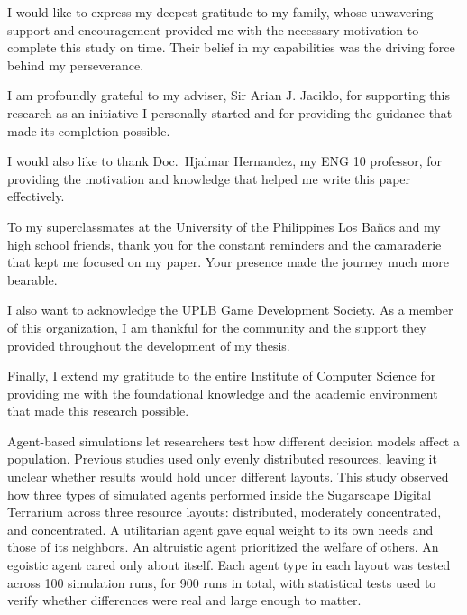 \documentclass{icsthesis}
\begin{document}
\begin{frontmatter}
\begin{biosketch}
			\addauthorsignaturefield
		\end{biosketch}

		\begin{acknowledgement}
			I would like to express my deepest gratitude to my family, whose unwavering support and encouragement provided me with the necessary motivation to complete this study on time. Their belief in my capabilities was the driving force behind my perseverance.

			I am profoundly grateful to my adviser, Sir Arian J. Jacildo, for supporting this research as an initiative I personally started and for providing the guidance that made its completion possible.

			I would also like to thank Doc.\ Hjalmar Hernandez, my ENG 10 professor, for providing the motivation and knowledge that helped me write this paper effectively.

			To my superclassmates at the University of the Philippines Los Ba\~{n}os and my high school friends, thank you for the constant reminders and the camaraderie that kept me focused on my paper. Your presence made the journey much more bearable.

			I also want to acknowledge the UPLB Game Development Society. As a member of this organization, I am thankful for the community and the support they provided throughout the development of my thesis.

			Finally, I extend my gratitude to the entire Institute of Computer Science for providing me with the foundational knowledge and the academic environment that made this research possible.
		\end{acknowledgement}
		
		\maketableofcontents
		
		\makelistoftables

		\makelistoffigures
	
		
		\begin{abstractwithpageno}	
			
Agent-based simulations let researchers test how different decision models affect a population. Previous studies used only evenly distributed resources, leaving it unclear whether results would hold under different layouts. This study observed how three types of simulated agents performed inside the Sugarscape Digital Terrarium across three resource layouts: distributed, moderately concentrated, and concentrated. A utilitarian agent gave equal weight to its own needs and those of its neighbors. An altruistic agent prioritized the welfare of others. An egoistic agent cared only about itself. Each agent type in each layout was tested across 100 simulation runs, for 900 runs in total, with statistical tests used to verify whether differences were real and large enough to matter.


\end{abstractwithpageno}
\end{frontmatter}
\end{document}
